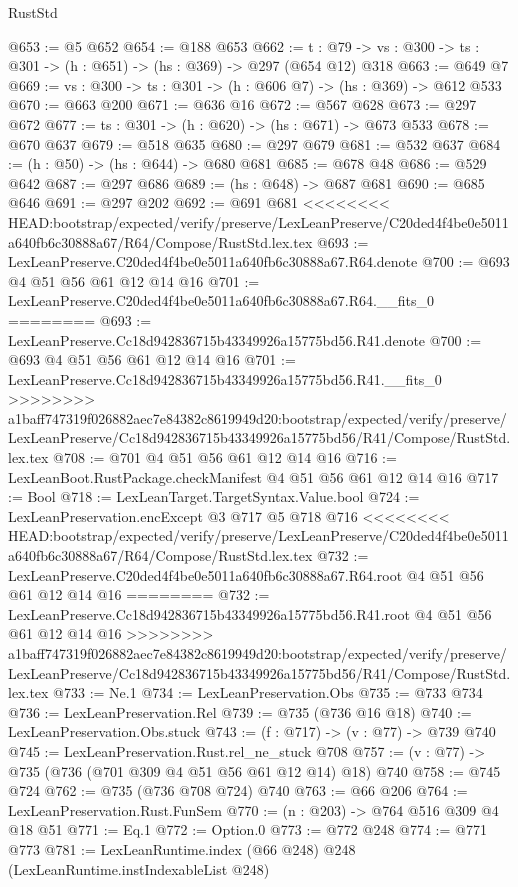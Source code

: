 \begin{lexlean}{RustStd}
\begin{coremodule}
{\begin{coremodule}
@653 := @5 @652
@654 := @188 @653
@662 := {t : @79} -> {vs : @300} -> {ts : @301} -> (h : @651) -> (hs : @369) -> @297 (@654 @12) @318
@663 := @649 @7
@669 := {vs : @300} -> {ts : @301} -> (h : @606 @7) -> (hs : @369) -> @612 @533
@670 := @663 @200
@671 := @636 @16
@672 := @567 @628
@673 := @297 @672
@677 := {ts : @301} -> (h : @620) -> (hs : @671) -> @673 @533
@678 := @670 @637
@679 := @518 @635
@680 := @297 @679
@681 := @532 @637
@684 := (h : @50) -> (hs : @644) -> @680 @681
@685 := @678 @48
@686 := @529 @642
@687 := @297 @686
@689 := (hs : @648) -> @687 @681
@690 := @685 @646
@691 := @297 @202
@692 := @691 @681
<<<<<<<< HEAD:bootstrap/expected/verify/preserve/LexLeanPreserve/C20ded4f4be0e5011a640fb6c30888a67/R64/Compose/RustStd.lex.tex
@693 := LexLeanPreserve.C20ded4f4be0e5011a640fb6c30888a67.R64.denote
@700 := @693 @4 @51 @56 @61 @12 @14 @16
@701 := LexLeanPreserve.C20ded4f4be0e5011a640fb6c30888a67.R64.__fits_0
========
@693 := LexLeanPreserve.Cc18d942836715b43349926a15775bd56.R41.denote
@700 := @693 @4 @51 @56 @61 @12 @14 @16
@701 := LexLeanPreserve.Cc18d942836715b43349926a15775bd56.R41.__fits_0
>>>>>>>> a1baff747319f026882aec7e84382c8619949d20:bootstrap/expected/verify/preserve/LexLeanPreserve/Cc18d942836715b43349926a15775bd56/R41/Compose/RustStd.lex.tex
@708 := @701 @4 @51 @56 @61 @12 @14 @16
@716 := LexLeanBoot.RustPackage.checkManifest @4 @51 @56 @61 @12 @14 @16
@717 := Bool
@718 := LexLeanTarget.TargetSyntax.Value.bool
@724 := LexLeanPreservation.encExcept @3 @717 @5 @718 @716
<<<<<<<< HEAD:bootstrap/expected/verify/preserve/LexLeanPreserve/C20ded4f4be0e5011a640fb6c30888a67/R64/Compose/RustStd.lex.tex
@732 := LexLeanPreserve.C20ded4f4be0e5011a640fb6c30888a67.R64.root @4 @51 @56 @61 @12 @14 @16
========
@732 := LexLeanPreserve.Cc18d942836715b43349926a15775bd56.R41.root @4 @51 @56 @61 @12 @14 @16
>>>>>>>> a1baff747319f026882aec7e84382c8619949d20:bootstrap/expected/verify/preserve/LexLeanPreserve/Cc18d942836715b43349926a15775bd56/R41/Compose/RustStd.lex.tex
@733 := Ne.{1}
@734 := LexLeanPreservation.Obs
@735 := @733 @734
@736 := LexLeanPreservation.Rel
@739 := @735 (@736 @16 @18)
@740 := LexLeanPreservation.Obs.stuck
@743 := (f : @717) -> (v : @77) -> @739 @740
@745 := LexLeanPreservation.Rust.rel_ne_stuck @708
@757 := (v : @77) -> @735 (@736 (@701 @309 @4 @51 @56 @61 @12 @14) @18) @740
@758 := @745 @724
@762 := @735 (@736 @708 @724) @740
@763 := @66 @206
@764 := LexLeanPreservation.Rust.FunSem
@770 := (n : @203) -> @764 @516 @309 @4 @18 @51
@771 := Eq.{1}
@772 := Option.{0}
@773 := @772 @248
@774 := @771 @773
@781 := LexLeanRuntime.index (@66 @248) @248 (LexLeanRuntime.instIndexableList @248)

\end{coremodule}}
\end{coremodule}
\end{lexlean}
